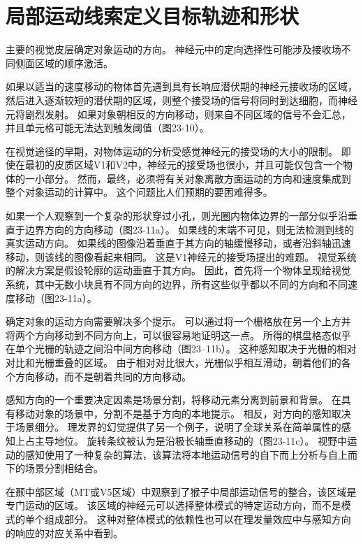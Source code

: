 \section{局部运动线索定义目标轨迹和形状}

主要的视觉皮层确定对象运动的方向。 
神经元中的定向选择性可能涉及接收场不同侧面区域的顺序激活。


如果以适当的速度移动的物体首先遇到具有长响应潜伏期的神经元接收场的区域，然后进入逐渐较短的潜伏期的区域，则整个接受场的信号将同时到达细胞，而神经元将剧烈发射。 
如果对象朝相反的方向移动，则来自不同区域的信号不会汇总，并且单元格可能无法达到触发阈值（图23-10）。


在视觉途径的早期，对物体运动的分析受感觉神经元的接受场的大小的限制。 
即使在最初的皮质区域V1和V2中，神经元的接受场也很小，并且可能仅包含一个物体的一小部分。 
然而，最终，必须将有关对象离散方面运动的方向和速度集成到整个对象运动的计算中。 
这个问题比人们预期的要困难得多。


如果一个人观察到一个复杂的形状穿过小孔，则光圈内物体边界的一部分似乎沿垂直于边界方向的方向移动（图23-11a）。 
如果线的末端不可见，则无法检测到线的真实运动方向。 
如果线的图像沿着垂直于其方向的轴缓慢移动，或者沿斜轴迅速移动，则该线的图像看起来相同。
这是V1神经元的接受场提出的难题。 
视觉系统的解决方案是假设轮廓的运动垂直于其方向。 
因此，首先将一个物体呈现给视觉系统，其中无数小块具有不同方向的边界，所有这些似乎都以不同的方向和不同速度移动（图23-11a）。


确定对象的运动方向需要解决多个提示。
可以通过将一个栅格放在另一个上方并将两个方向移动到不同方向上，可以很容易地证明这一点。
所得的棋盘格态似乎在单个光栅的轨迹之间沿中间方向移动（图23–11b）。 
这种感知取决于光栅的相对对比和光栅重叠的区域。 
由于相对对比很大，光栅似乎相互滑动，朝着他们的各个方向移动，而不是朝着共同的方向移动。


感知方向的一个重要决定因素是场景分割，将移动元素分离到前景和背景。
在具有移动对象的场景中，分割不是基于方向的本地提示。
相反，对方向的感知取决于场景细分。
理发界的幻觉提供了另一个例子，说明了全球关系在简单属性的感知上占主导地位。
旋转条纹被认为是沿极长轴垂直移动的（图23-11c）。 
视野中运动的感知使用了一种复杂的算法，该算法将本地运动信号的自下而上分析与自上而下的场景分割相结合。


在颞中部区域（MT或V5区域）中观察到了猴子中局部运动信号的整合，该区域是专门运动的区域。
该区域的神经元可以选择整体模式的特定运动方向，而不是模式的单个组成部分。
这种对整体模式的依赖性也可以在理发量效应中与感知方向的响应的对应关系中看到。



